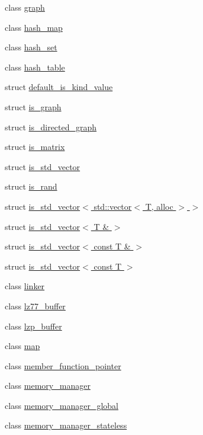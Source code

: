 \begin{DoxyCompactItemize}
\item 
class \hyperlink{classdlib_1_1graph}{graph}
\item 
class \hyperlink{classdlib_1_1hash__map}{hash\_\-map}
\item 
class \hyperlink{classdlib_1_1hash__set}{hash\_\-set}
\item 
class \hyperlink{classdlib_1_1hash__table}{hash\_\-table}
\item 
struct \hyperlink{structdlib_1_1default__is__kind__value}{default\_\-is\_\-kind\_\-value}
\item 
struct \hyperlink{structdlib_1_1is__graph}{is\_\-graph}
\item 
struct \hyperlink{structdlib_1_1is__directed__graph}{is\_\-directed\_\-graph}
\item 
struct \hyperlink{structdlib_1_1is__matrix}{is\_\-matrix}
\item 
struct \hyperlink{structdlib_1_1is__std__vector}{is\_\-std\_\-vector}
\item 
struct \hyperlink{structdlib_1_1is__rand}{is\_\-rand}
\item 
struct \hyperlink{structdlib_1_1is__std__vector_3_01std_1_1vector_3_01T_00_01alloc_01_4_01_4}{is\_\-std\_\-vector$<$ std::vector$<$ T, alloc $>$ $>$}
\item 
struct \hyperlink{structdlib_1_1is__std__vector_3_01T_01_6_01_4}{is\_\-std\_\-vector$<$ T \& $>$}
\item 
struct \hyperlink{structdlib_1_1is__std__vector_3_01const_01T_01_6_01_4}{is\_\-std\_\-vector$<$ const T \& $>$}
\item 
struct \hyperlink{structdlib_1_1is__std__vector_3_01const_01T_01_4}{is\_\-std\_\-vector$<$ const T $>$}
\item 
class \hyperlink{classdlib_1_1linker}{linker}
\item 
class \hyperlink{classdlib_1_1lz77__buffer}{lz77\_\-buffer}
\item 
class \hyperlink{classdlib_1_1lzp__buffer}{lzp\_\-buffer}
\item 
class \hyperlink{classdlib_1_1map}{map}
\item 
class \hyperlink{classdlib_1_1member__function__pointer}{member\_\-function\_\-pointer}
\item 
class \hyperlink{classdlib_1_1memory__manager}{memory\_\-manager}
\item 
class \hyperlink{classdlib_1_1memory__manager__global}{memory\_\-manager\_\-global}
\item 
class \hyperlink{classdlib_1_1memory__manager__stateless}{memory\_\-manager\_\-stateless}

\end{DoxyCompactItemize}
